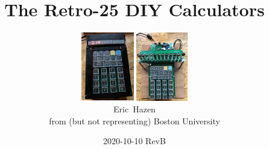 \documentclass{beamer}
\newcommand{\tblue}[1]{\textcolor{my-blue}{#1}}
\begin{document}
\hypersetup{urlcolor=my-blue}




\title{The Retro-25 DIY Calculators}
\date{2020-10-10 RevB}
\author
{
 \begin{center}
   \includegraphics[height=3cm]{figs/led_front.jpg} 
   \includegraphics[height=3cm]{figs/vfd_over.jpg}
 \end{center}
Eric~Hazen \\
\scriptsize
\tblue{from (but not representing) Boston University}
}

\newcommand{\spage}[1]{
\begin{frame}
  \begin{tikzpicture}[remember picture, overlay]
  \node[anchor=north]at(current page.north){
     \texttt{[image: \#1]}
  };
  \end{tikzpicture}
\end{frame}
}
\frame{\titlepage}
\end{document}

